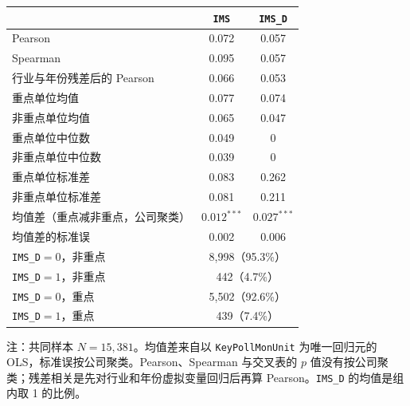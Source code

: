 \begin{center}
\begin{threeparttable}
\caption{重点排污单位与行业专长的相关}
\label{tab:keypoll-corr}
\begin{tabular}{lcc}
\toprule
 & \texttt{IMS} & \texttt{IMS\_D} \\
\midrule
Pearson & 0.072 & 0.057 \\
Spearman & 0.095 & 0.057 \\
行业与年份残差后的 Pearson & 0.066 & 0.053 \\
\midrule
重点单位均值 & 0.077 & 0.074 \\
非重点单位均值 & 0.065 & 0.047 \\
重点单位中位数 & 0.049 & 0 \\
非重点单位中位数 & 0.039 & 0 \\
重点单位标准差 & 0.083 & 0.262 \\
非重点单位标准差 & 0.081 & 0.211 \\
均值差（重点减非重点，公司聚类） & $0.012^{***}$ & $0.027^{***}$ \\
均值差的标准误 & 0.002 & 0.006 \\
\midrule
\texttt{IMS\_D}$=0$，非重点 & \multicolumn{2}{c}{8{,}998（95.3\%）} \\
\texttt{IMS\_D}$=1$，非重点 & \multicolumn{2}{c}{442（4.7\%）} \\
\texttt{IMS\_D}$=0$，重点 & \multicolumn{2}{c}{5{,}502（92.6\%）} \\
\texttt{IMS\_D}$=1$，重点 & \multicolumn{2}{c}{439（7.4\%）} \\
\bottomrule
\end{tabular}
\begin{tablenotes}\footnotesize
\item 注：共同样本 $N=15{,}381$。均值差来自以 \texttt{KeyPollMonUnit} 为唯一回归元的 OLS，标准误按公司聚类。Pearson、Spearman 与交叉表的 $p$ 值没有按公司聚类；残差相关是先对行业和年份虚拟变量回归后再算 Pearson。\texttt{IMS\_D} 的均值是组内取 1 的比例。
\end{tablenotes}
\end{threeparttable}
\end{center}

